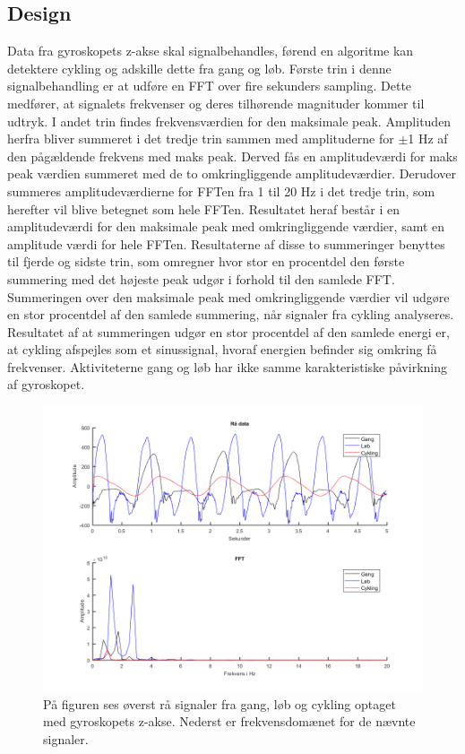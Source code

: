 \subsection{Design}\label{design_cykling}
Data fra gyroskopets z-akse skal signalbehandles, førend en algoritme kan detektere cykling og adskille dette fra gang og løb. Første trin i denne signalbehandling er at udføre en FFT over fire sekunders sampling. Dette medfører, at signalets frekvenser og deres tilhørende magnituder kommer til udtryk. I andet trin findes frekvensværdien for den maksimale peak. Amplituden herfra bliver summeret i det tredje trin sammen med amplituderne for $\pm$1 Hz af den pågældende frekvens med maks peak. Derved fås en amplitudeværdi for maks peak værdien summeret med de to omkringliggende amplitudeværdier. Derudover summeres amplitudeværdierne for FFTen fra 1 til 20 Hz i det tredje trin, som herefter vil blive betegnet som hele FFTen. Resultatet heraf består i en amplitudeværdi for den maksimale peak med omkringliggende værdier, samt en amplitude værdi for hele FFTen. Resultaterne af disse to summeringer benyttes til fjerde og sidste trin, som omregner hvor stor en procentdel den første summering med det højeste peak udgør i forhold til den samlede FFT. Summeringen over den maksimale peak med omkringliggende værdier vil udgøre en stor procentdel af den samlede summering, når signaler fra cykling analyseres. Resultatet af at summeringen udgør en stor procentdel af den samlede energi er, at cykling afspejles som et sinussignal, hvoraf energien befinder sig omkring få frekvenser. Aktiviteterne gang og løb har ikke samme karakteristiske påvirkning af gyroskopet.
\begin{figure}[H]
	\centering
	\includegraphics[scale=0.8]{figures/cDesign/gyro_behandling.png}
	\caption{På figuren ses øverst rå signaler fra gang, løb og cykling optaget med gyroskopets z-akse. Nederst er frekvensdomænet for de nævnte signaler.}
	\label{fig:gyro_behandling}
\end{figure}\vspace{-0.5cm}
